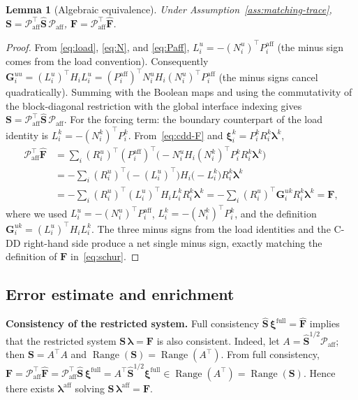 \documentclass[11pt,a4paper]{article}
\newtheorem{lemma}[assumption]{Lemma}
\newcommand{\trac}{\bm{\lambda}}
\newcommand{\DtN}{\mathbf{G}}
\newcommand{\Schur}{\mathbf{S}}
\newcommand{\Range}{\operatorname{Range}}
\begin{document}
\begin{lemma}[Algebraic equivalence]\label{lem:equivalence}
  Under Assumption~\ref{ass:matching-trace},
  $\Schur = \mathcal{P}_{\text{aff}}^\top \widehat{\Schur}\,
           \mathcal{P}_{\text{aff}}$,
  $\bm{F} = \mathcal{P}_{\text{aff}}^\top \widehat{\bm{F}}$.
\end{lemma}

\begin{proof}
  From \eqref{eq:load}, \eqref{eq:N}, and \eqref{eq:Paff},
  $L_i^u = -(N_i^u)^\top P_i^{\text{aff}}$
  (the minus sign comes from the load convention).
  Consequently
  $\DtN_i^{uu} = (L_i^u)^\top H_i L_i^u
   = (P_i^{\text{aff}})^\top N_i^u H_i (N_i^u)^\top P_i^{\text{aff}}$
  (the minus signs cancel quadratically).
  Summing with the Boolean maps and using the commutativity of the
  block-diagonal restriction with the global interface indexing gives
  $\Schur = \mathcal{P}_{\text{aff}}^\top \widehat{\Schur}\,
   \mathcal{P}_{\text{aff}}$.
  For the forcing term: the boundary counterpart of the load identity is
  $L_i^k = -(N_i^k)^\top P_i^k$.
  From~\eqref{eq:cdd-F} and $\bm{\xi}_i^k = P_i^k R_i^k
  \trac^k$,
  \begin{align*}
    \mathcal{P}_{\text{aff}}^\top \widehat{\bm{F}}
    &= \sum_i (R_i^u)^\top (P_i^{\text{aff}})^\top
       \bigl(-N_i^u H_i (N_i^k)^\top P_i^k
       R_i^k \trac^k\bigr) \\
    &= -\sum_i (R_i^u)^\top
       \bigl(-(L_i^u)^\top\bigr) H_i \bigl(-L_i^k\bigr)
       R_i^k \trac^k \\
    &= -\sum_i (R_i^u)^\top (L_i^u)^\top H_i L_i^k R_i^k \trac^k
     = -\sum_i (R_i^u)^\top \DtN_i^{uk} R_i^k \trac^k
     = \bm{F},
  \end{align*}
  where we used $L_i^u = -(N_i^u)^\top P_i^{\text{aff}}$,
  $L_i^k = -(N_i^k)^\top P_i^k$, and the definition
  $\DtN_i^{uk} = (L_i^u)^\top H_i L_i^k$.
  The three minus signs from the load identities and the C-DD right-hand
  side produce a net single minus sign, exactly matching the definition
  of $\bm{F}$ in~\eqref{eq:schur}.
\end{proof}

\subsection{Error estimate and enrichment}

\textbf{Consistency of the restricted system.}
  Full consistency $\widehat{\Schur}\,\bm{\xi}^{\text{full}}
  = \widehat{\bm{F}}$ implies that the restricted system
  $\Schur\,\trac = \bm{F}$ is also consistent.
  Indeed, let $A = \widehat{\Schur}^{1/2}\mathcal{P}_{\text{aff}}$;
  then $\Schur = A^\top A$ and $\Range(\Schur) = \Range(A^\top)$.
  From full consistency,
  $\bm{F} = \mathcal{P}_{\text{aff}}^\top \widehat{\bm{F}}
   = \mathcal{P}_{\text{aff}}^\top \widehat{\Schur}\,
     \bm{\xi}^{\text{full}}
   = A^\top \widehat{\Schur}^{1/2}\bm{\xi}^{\text{full}}
   \in \Range(A^\top) = \Range(\Schur)$.
  Hence there exists $\trac^{\text{aff}}$ solving
  $\Schur\,\trac^{\text{aff}} = \bm{F}$.
\end{document}
